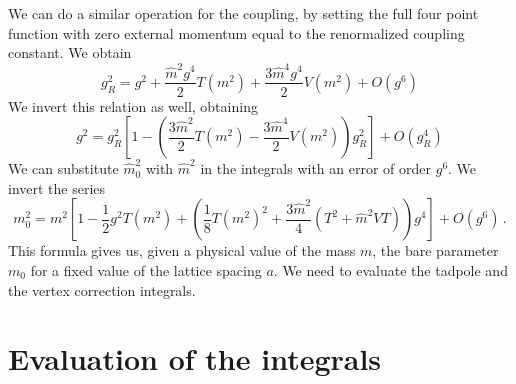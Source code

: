 \documentclass[12pt,a4paper]{report}
\begin{document}
 
 We can do a similar operation for the coupling, by setting the full four point function with zero external momentum equal to the renormalized coupling constant. We obtain \begin{equation}
 g_R^2 = g^2 +\dfrac{\hat m^2 g^4}{2} T(m^2) + \dfrac{3 \hat
  m^4 g^4}{2} V(m^2) + O(g^6)
\end{equation} We invert this relation as well, obtaining \begin{equation}
g^2 = g_R^2\left[1- \left(\dfrac{3 \hat m^2}{2}T(m^2) - \dfrac{3\hat  m^4}{2}V(m^2) \right)g_R^2 \right] + O(g_R^4)
\end{equation} 
 We can substitute $\hat m_0^2$ with $\hat m^2$ in the integrals with an error of order $g^6$. We invert the series \begin{equation}
  m_0^2 =  m^2\left[1 - \frac{1}{2}g^2 T(  m^2) + \left( \frac{1}{8}  T(m^2)^2+ \dfrac{3 \hat m^2}{4}(T^2 + \hat m^2 V T) \right) g^4  \right] + O( g^6 ) \,.
 \end{equation} This formula gives us, given a physical value of the mass $m$, the bare parameter $m_0$ for a fixed value of the lattice spacing $a$. We need to evaluate the tadpole and the vertex correction integrals.
  
 \section{Evaluation of the integrals}
 
\end{document}
